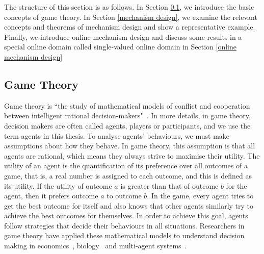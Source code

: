 \documentclass[11pt]{phdthesis}
\begin{document}
The structure of this section is as follows. 
In Section \ref{game theory}, we introduce the basic concepts of game theory. In Section \ref{mechanism design}, we examine the relevant concepts and theorems of mechanism design and show a representative example. Finally, we introduce online mechanism design and discuss some results in a special online domain called single-valued online domain in Section \ref{online mechanism design}

\subsection{Game Theory} \label{game theory}

Game theory is ``the study of mathematical models of conflict and cooperation between intelligent rational decision-makers"~\citep{roger1991game}. In more details, in game theory, decision makers are often called agents, players or participants, and we use the term agents in this thesis. To analyse agents' behaviours, we must make assumptions about how they behave. In game theory, this assumption is that all agents are rational, which means they always strive to maximise their utility. The utility of an agent is the quantification of its preference over all outcomes of a game, that is, a real number is assigned to each outcome, and this is defined as its utility. If the utility of outcome $ a $ is greater than that of outcome $ b $ for the agent, then it prefers outcome $ a $ to outcome $ b $. In the game, every agent tries to get the best outcome for itself and also knows that other agents similarly try to achieve the best outcomes for themselves. In order to achieve this goal, agents follow strategies that decide their behaviours in all situations. Researchers in game theory have applied these mathematical models to understand decision making in economics~\citep{gu2005price,kelly2003decision}, biology~\citep{hammerstein1994game,dugatkin2000game} and multi-agent systems~\citep{parsons2002game,semsar2009multi}.
\end{document}
